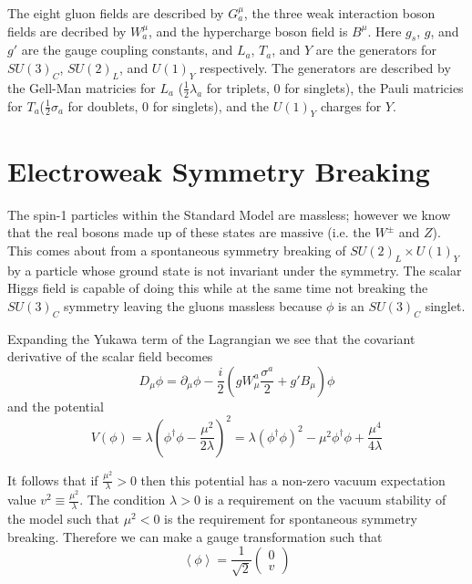 The eight gluon fields are described by $G^{\mu}_a$, the three weak interaction boson fields are decribed by $W^{\mu}_a$, and the hypercharge boson field is $B^{\mu}$.  Here $g_s$, $g$, and $g'$ are the gauge coupling constants, and $L_a$, $T_a$, and $Y$ are the generators for $SU(3)_C$, $SU(2)_L$, and $U(1)_Y$ respectively.   The generators are described by the Gell-Man matricies for $L_a$ ($\frac{1}{2}\lambda_a$ for triplets, 0 for singlets), the Pauli matricies for $T_a$($\frac{1}{2}\sigma_a$ for doublets, 0 for singlets), and the $U(1)_Y$ charges for $Y$.



\section{Electroweak Symmetry Breaking}
\label{sec:EWSB}
  The spin-1 particles within the Standard Model are massless; however we know that the real bosons made up of these states are massive (i.e. the $W^\pm$ and $Z$).  This comes about from a spontaneous symmetry breaking of $SU(2)_L \times U(1)_Y$ by a particle whose ground state is not invariant under the symmetry.  The scalar Higgs field is capable of doing this while at the same time not breaking the $SU(3)_C$ symmetry leaving the gluons massless because $\phi$ is an $SU(3)_C$ singlet.

Expanding the Yukawa term of the Lagrangian we see that the covariant derivative of the scalar field becomes
\[ D_{\mu} \phi = \partial_\mu \phi - \frac{i}{2}(gW_{\mu}^{a} \frac{\sigma^a}{2}+g' B_\mu)\phi
\]
and the potential
\[ V(\phi) = \lambda (\phi^{\dagger} \phi - \frac{\mu^2}{2 \lambda})^2 = \lambda(\phi^\dagger \phi)^2 -\mu^2 \phi^\dagger \phi + \frac{\mu^4}{4\lambda}
\]

It follows that if $\frac{\mu^2}{\lambda}>0$ then this potential has a non-zero vacuum expectation value $v^2 \equiv \frac{\mu^2}{\lambda}$.  The condition $\lambda>0$ is a requirement on the vacuum stability of the model such that $\mu^2 <0$ is the requirement for spontaneous symmetry breaking.  Therefore we can make a gauge transformation such that 
\[ \left<{\phi}\right>=\frac{1}{\sqrt{2}}\begin{pmatrix} 0\\v\end{pmatrix}
\]

